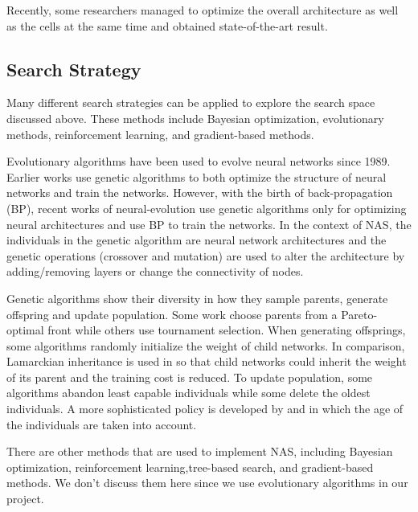 \documentclass[conference]{IEEEtran}
\begin{document}
  Recently, some researchers managed to optimize the overall architecture as well as the cells at the same time and obtained state-of-the-art result\cite{liu2019auto}.
  
  \subsection{Search Strategy}
  
  Many different search strategies can be applied to explore the search space discussed above. These methods include Bayesian optimization, evolutionary methods, reinforcement learning, and gradient-based methods. 

  Evolutionary algorithms have been used to evolve neural networks since 1989\cite{miller1989designing}. Earlier works use genetic algorithms to both optimize the structure of neural networks and train the networks\cite{stanley2002evolving}. However, with the birth of back-propagation (BP), recent works of neural-evolution use genetic algorithms only for optimizing neural architectures and use BP to train the networks\cite{real2017large}. In the context of NAS, the individuals in the genetic algorithm are neural network architectures and the genetic operations (crossover and mutation) are used to alter the architecture by adding/removing layers or change the connectivity of nodes.

  Genetic algorithms show their diversity in how they sample parents, generate offspring and update population. Some work choose parents from a Pareto-optimal front\cite{elsken2018efficient} while others use tournament selection\cite{liu2018progressive}\cite{real2018regularized}\cite{real2017large}. When generating offsprings, some algorithms randomly initialize the weight of child networks. In comparison, Lamarckian inheritance is used in \cite{elsken2018efficient} so that child networks could inherit the weight of its parent and the training cost is reduced. To update population, some algorithms abandon least capable individuals\cite{real2017large} while some delete the oldest individuals\cite{real2018regularized}. A more sophisticated policy is developed by \cite{Hornby:2006:AAP:1143997.1144142} and \cite{DBLP:journals/corr/abs-1802-01548} in which the age of the individuals are taken into account.
  
  There are other methods that are used to implement NAS, including Bayesian optimization, reinforcement learning,tree-based search, and gradient-based methods. We don't discuss them here since we use evolutionary algorithms in our project.
\end{document}
